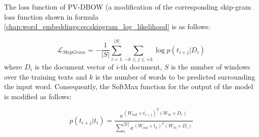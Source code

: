 The loss function of PV-DBOW (a modification of the corresponding skip-gram loss function shown in formula \ref{chap:word_embeddings:eq:skipgram_log_likelihood} is as follows: 

\begin{equation} \label{chap:word_embeddings:eq:pvbow_log_likelihood}
	 \mathcal{L}_{SkipGram} = -\frac{1}{|S|} \sum_{i=1}^{|S|}{ \sum_{-k \leq j \leq +k}{ \log {p(t_{i+j}|D_{i})}  } }
\end{equation}
\noindent
where $D_{i}$ is the document vector of $i$-th document, $S$ is the number of windows over the training texts and $k$ is the number of words to be predicted surrounding the input word. Consequently,  the SoftMax function for the output of the model is modified as follows:

\begin{equation} \label{chap:word_embeddings:eq:pvbow_softmax}
	p(t_{i+j}|t_{i}) = \frac{ e^{(W_{out}  \times  t_{i+j})^{T} (W_{in} \times  D_{i})}}{\sum^{|V|}_{i}{ e^{(W_{out}  \times  t_{k})^{T} (W_{in} \times  D_{i})}}} 
\end{equation}

